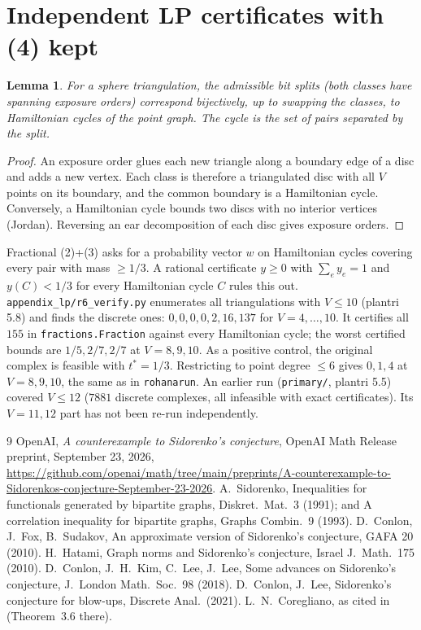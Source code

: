 \documentclass[11pt]{amsart}
\newtheorem{lemma}[theorem]{Lemma}
\theoremstyle{definition}
\theoremstyle{remark}
\newcommand{\1}{\mathbf 1}
\begin{document}
\appendix
\section{Independent LP certificates with (4) kept}\label{app:lp}
\begin{lemma}\label{lem:ham}
For a sphere triangulation, the admissible bit splits (both classes have spanning exposure orders) correspond
bijectively, up to swapping the classes, to Hamiltonian cycles of the point graph. The cycle is the set of pairs
separated by the split.
\end{lemma}
\begin{proof}
An exposure order glues each new triangle along a boundary edge of a disc and adds a new vertex. Each class is
therefore a triangulated disc with all $V$ points on its boundary, and the common boundary is a Hamiltonian
cycle. Conversely, a Hamiltonian cycle bounds two discs with no interior vertices (Jordan). Reversing an
ear decomposition of each disc gives exposure orders.
\end{proof}
Fractional (2)+(3) asks for a probability vector $w$ on Hamiltonian cycles covering every pair with mass $\ge1/3$. A
rational certificate $y\ge0$ with $\sum_ey_e=1$ and $y(C)<1/3$ for every Hamiltonian cycle $C$ rules this out.
\texttt{appendix\_lp/r6\_verify.py} enumerates all triangulations with $V\le10$ (plantri 5.8) and finds the discrete ones:
$0,0,0,0,2,16,137$ for $V=4,\dots,10$. It certifies all $155$ in \texttt{fractions.Fraction} against every Hamiltonian cycle; the
worst certified bounds are $1/5,2/7,2/7$ at $V=8,9,10$. As a positive control, the original complex is feasible with
$t^*=1/3$. Restricting to point degree $\le6$ gives $0,1,4$ at $V=8,9,10$, the same as in
\texttt{rohanarun}. An earlier run (\texttt{primary/}, plantri 5.5) covered $V\le12$ ($7881$ discrete complexes, all
infeasible with exact certificates). Its $V=11,12$ part has not been re-run independently.

\begin{thebibliography}{9}
 OpenAI, \emph{A counterexample to Sidorenko's conjecture}, OpenAI Math Release preprint, September 23, 2026,
\url{https://github.com/openai/math/tree/main/preprints/A-counterexample-to-Sidorenkos-conjecture-September-23-2026}.
 A.~Sidorenko, Inequalities for functionals generated by bipartite graphs, Diskret.\ Mat.\ 3 (1991); and A correlation inequality for bipartite graphs, Graphs Combin.\ 9 (1993).
 D.~Conlon, J.~Fox, B.~Sudakov, An approximate version of Sidorenko's conjecture, GAFA 20 (2010).
 H.~Hatami, Graph norms and Sidorenko's conjecture, Israel J.\ Math.\ 175 (2010).
 D.~Conlon, J.~H.~Kim, C.~Lee, J.~Lee, Some advances on Sidorenko's conjecture, J.\ London Math.\ Soc.\ 98 (2018).
 D.~Conlon, J.~Lee, Sidorenko's conjecture for blow-ups, Discrete Anal.\ (2021).
 L.~N.~Coregliano, as cited in \cite[\S1]{oai} (Theorem~3.6 there).
\end{thebibliography}
\end{document}
